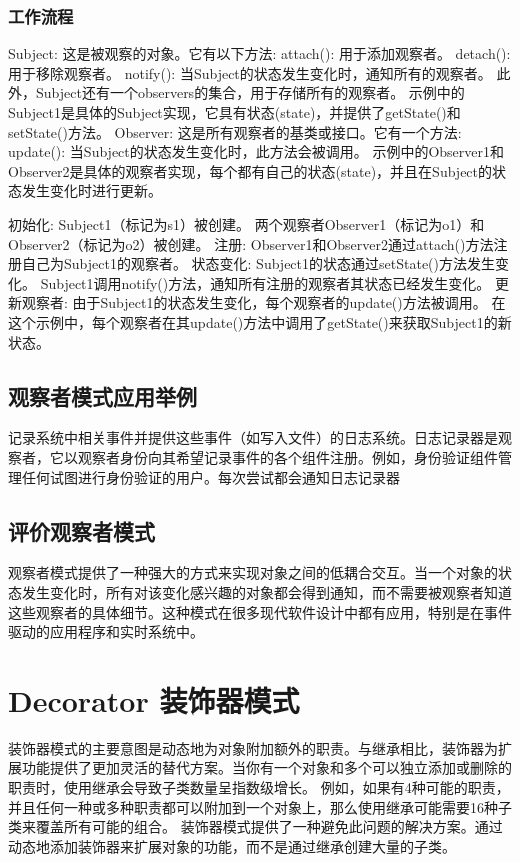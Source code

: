 \subsubsection{工作流程}
Subject:
这是被观察的对象。它有以下方法:
attach(): 用于添加观察者。
detach(): 用于移除观察者。
notify(): 当Subject的状态发生变化时，通知所有的观察者。
此外，Subject还有一个observers的集合，用于存储所有的观察者。
示例中的Subject1是具体的Subject实现，它具有状态(state)，并提供了getState()和setState()方法。
Observer:
这是所有观察者的基类或接口。它有一个方法:
update(): 当Subject的状态发生变化时，此方法会被调用。
示例中的Observer1和Observer2是具体的观察者实现，每个都有自己的状态(state)，并且在Subject的状态发生变化时进行更新。

初始化:
Subject1（标记为s1）被创建。
两个观察者Observer1（标记为o1）和Observer2（标记为o2）被创建。
注册:
Observer1和Observer2通过attach()方法注册自己为Subject1的观察者。
状态变化:
Subject1的状态通过setState()方法发生变化。
Subject1调用notify()方法，通知所有注册的观察者其状态已经发生变化。
更新观察者:
由于Subject1的状态发生变化，每个观察者的update()方法被调用。
在这个示例中，每个观察者在其update()方法中调用了getState()来获取Subject1的新状态。

\subsection{观察者模式应用举例}
记录系统中相关事件并提供这些事件（如写入文件）的日志系统。日志记录器是观察者，它以观察者身份向其希望记录事件的各个组件注册。例如，身份验证组件管理任何试图进行身份验证的用户。每次尝试都会通知日志记录器

\subsection{评价观察者模式}

观察者模式提供了一种强大的方式来实现对象之间的低耦合交互。当一个对象的状态发生变化时，所有对该变化感兴趣的对象都会得到通知，而不需要被观察者知道这些观察者的具体细节。这种模式在很多现代软件设计中都有应用，特别是在事件驱动的应用程序和实时系统中。

\section{Decorator 装饰器模式}

装饰器模式的主要意图是动态地为对象附加额外的职责。与继承相比，装饰器为扩展功能提供了更加灵活的替代方案。当你有一个对象和多个可以独立添加或删除的职责时，使用继承会导致子类数量呈指数级增长。
例如，如果有4种可能的职责，并且任何一种或多种职责都可以附加到一个对象上，那么使用继承可能需要16种子类来覆盖所有可能的组合。
装饰器模式提供了一种避免此问题的解决方案。通过动态地添加装饰器来扩展对象的功能，而不是通过继承创建大量的子类。

